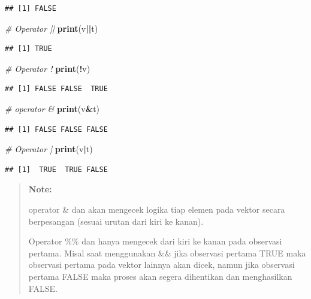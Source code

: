 \documentclass[]{book}
\newenvironment{Shaded}{\begin{snugshade}}{\end{snugshade}}
\newcommand{\KeywordTok}[1]{\textcolor[rgb]{0.13,0.29,0.53}{\textbf{#1}}}
\newcommand{\CommentTok}[1]{\textcolor[rgb]{0.56,0.35,0.01}{\textit{#1}}}
\newcommand{\OperatorTok}[1]{\textcolor[rgb]{0.81,0.36,0.00}{\textbf{#1}}}
\newcommand{\NormalTok}[1]{#1}
\begin{document}
\begin{verbatim}
## [1] FALSE
\end{verbatim}

\begin{Shaded}
\begin{Highlighting}[]
\CommentTok{# Operator ||}
\KeywordTok{print}\NormalTok{(v}\OperatorTok{||}\NormalTok{t)}
\end{Highlighting}
\end{Shaded}

\begin{verbatim}
## [1] TRUE
\end{verbatim}

\begin{Shaded}
\begin{Highlighting}[]
\CommentTok{# Operator !}
\KeywordTok{print}\NormalTok{(}\OperatorTok{!}\NormalTok{v)}
\end{Highlighting}
\end{Shaded}

\begin{verbatim}
## [1] FALSE FALSE  TRUE
\end{verbatim}

\begin{Shaded}
\begin{Highlighting}[]
\CommentTok{# operator &}
\KeywordTok{print}\NormalTok{(v}\OperatorTok{&}\NormalTok{t)}
\end{Highlighting}
\end{Shaded}

\begin{verbatim}
## [1] FALSE FALSE FALSE
\end{verbatim}

\begin{Shaded}
\begin{Highlighting}[]
\CommentTok{# Operator |}
\KeywordTok{print}\NormalTok{(v}\OperatorTok{|}\NormalTok{t)}
\end{Highlighting}
\end{Shaded}

\begin{verbatim}
## [1]  TRUE  TRUE FALSE
\end{verbatim}

\begin{quote}
\textbf{Note: }

operator \& dan \textbar{} akan mengecek logika tiap elemen pada vektor
secara berpesangan (sesuai urutan dari kiri ke kanan).

Operator \%\% dan \textbar{}\textbar{} hanya mengecek dari kiri ke kanan
pada observasi pertama. Misal saat menggunakan \&\& jika observasi
pertama TRUE maka observasi pertama pada vektor lainnya akan dicek,
namun jika observasi pertama FALSE maka proses akan segera dihentikan
dan menghasilkan FALSE.
\end{quote}
\end{document}
